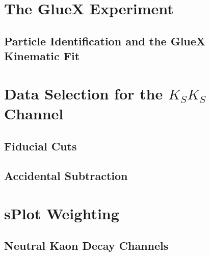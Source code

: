 \section{The GlueX Experiment}

\subsection{Particle Identification and the GlueX Kinematic Fit}\label{sub:particle-identification-and-the-gluex-kinematic-fit}

\section{Data Selection for the $K_SK_S$ Channel}\label{sec:data-selection}

\subsection{Fiducial Cuts}\label{sub:fiducial-cuts}

\subsection{Accidental Subtraction}\label{sub:accidental-subtraction}

\section{sPlot Weighting}\label{sec:splot}

\subsection{Neutral Kaon Decay Channels}\label{sub:neutral-kaon-decay-channels}
